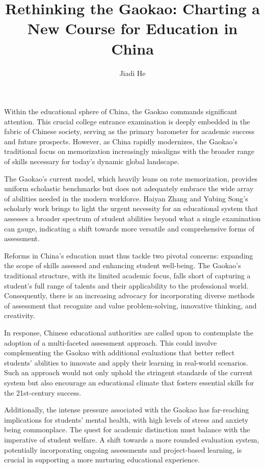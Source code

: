 \documentclass[11pt]{article}
\title{Rethinking the Gaokao: Charting a New Course for Education in China}
\author{Jiadi He}
\begin{document}
\maketitle
\keywordsline

Within the educational sphere of China, the Gaokao commands significant attention. This crucial college entrance examination is deeply embedded in the fabric of Chinese society, serving as the primary barometer for academic success and future prospects. However, as China rapidly modernizes, the Gaokao's traditional focus on memorization increasingly misaligns with the broader range of skills necessary for today's dynamic global landscape.

The Gaokao's current model, which heavily leans on rote memorization, provides uniform scholastic benchmarks but does not adequately embrace the wide array of abilities needed in the modern workforce. Haiyan Zhang and Yubing Song's scholarly work brings to light the urgent necessity for an educational system that assesses a broader spectrum of student abilities beyond what a single examination can gauge, indicating a shift towards more versatile and comprehensive forms of assessment.

Reforms in China's education must thus tackle two pivotal concerns: expanding the scope of skills assessed and enhancing student well-being. The Gaokao's traditional structure, with its limited academic focus, falls short of capturing a student's full range of talents and their applicability to the professional world. Consequently, there is an increasing advocacy for incorporating diverse methods of assessment that recognize and value problem-solving, innovative thinking, and creativity.

In response, Chinese educational authorities are called upon to contemplate the adoption of a multi-faceted assessment approach. This could involve complementing the Gaokao with additional evaluations that better reflect students' abilities to innovate and apply their learning in real-world scenarios. Such an approach would not only uphold the stringent standards of the current system but also encourage an educational climate that fosters essential skills for the 21st-century success.

Additionally, the intense pressure associated with the Gaokao has far-reaching implications for students' mental health, with high levels of stress and anxiety being commonplace. The quest for academic distinction must balance with the imperative of student welfare. A shift towards a more rounded evaluation system, potentially incorporating ongoing assessments and project-based learning, is crucial in supporting a more nurturing educational experience.
\end{document}
